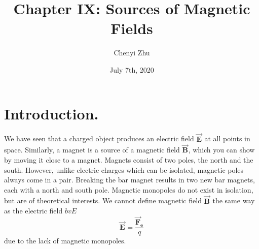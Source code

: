 \documentclass[11pt, letterpaper]{article}
\title{Chapter IX: Sources of Magnetic Fields}
\author{Chenyi Zhu}
\date{July 7th, 2020}
\theoremstyle{definition}
\theoremstyle{remark}
\newcommand{\bv}[2][]{\bm{\vec{#2}_{#1}}}
\begin{document}
\begin{titlingpage}
	\maketitle
	
	\begin{figure}[h!]
		\centering
		
	\end{figure}
		
\end{titlingpage}

\section{Introduction.}\label{sec:intro}
We have seen that a charged object produces an electric field $\bv{E}$ at all points in space. Similarly, a magnet is a source of a magnetic field $\bv{B}$, which you can show by moving it close to a magnet. Magnets consist of two poles, the north and the south. However, unlike electric charges which can be isolated, magnetic poles always come in a pair. Breaking the bar magnet results in two new bar magnets, each with a north and south pole. Magnetic monopoles do not exist in isolation, but are of theoretical interests. We cannot define magnetic field $\bv{B}$ the same way as the electric field $bv{E}$ \[\bv{E} = \frac{\bv[e]{F}}{q}\] due to the lack of magnetic monopoles. 
\end{document}
